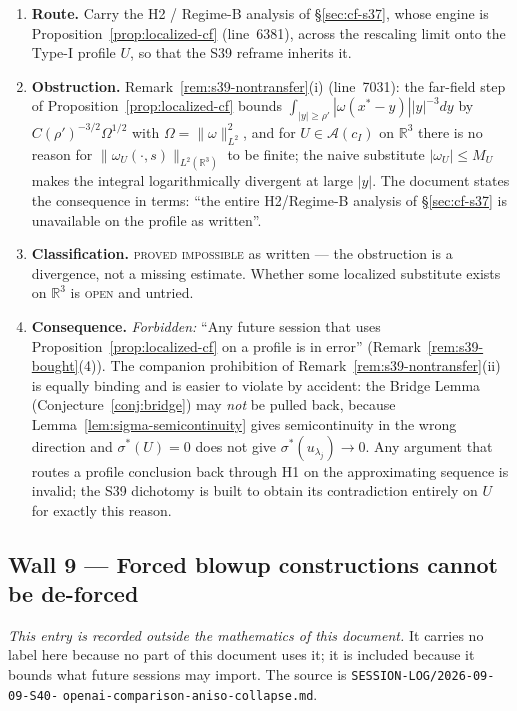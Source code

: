 \documentclass[11pt]{article}
\theoremstyle{definition}
\theoremstyle{remark}
\newcommand{\R}{\mathbb{R}}
\begin{document}
\begin{enumerate}[label=(\alph*),leftmargin=2.2em]
  \item \textbf{Route.} Carry the H2 / Regime-B analysis of
    \S\ref{sec:cf-s37}, whose engine is
    Proposition~\ref{prop:localized-cf} (line~6381), across the rescaling
    limit onto the Type-I profile $U$, so that the S39 reframe inherits it.
  \item \textbf{Obstruction.} Remark~\ref{rem:s39-nontransfer}(i)
    (line~7031): the far-field step of
    Proposition~\ref{prop:localized-cf} bounds
    $\int_{|y|\geq\rho'}|\omega(x^*-y)||y|^{-3}dy$ by
    $C(\rho')^{-3/2}\Omega^{1/2}$ with $\Omega=\|\omega\|_{L^2}^2$, and for
    $U\in\mathcal{A}(c_I)$ on $\R^3$ there is no reason for
    $\|\omega_U(\cdot,s)\|_{L^2(\R^3)}$ to be finite; the naive substitute
    $|\omega_U|\leq M_U$ makes the integral logarithmically divergent at
    large $|y|$. The document states the consequence in terms: ``the entire
    H2/Regime-B analysis of \S\ref{sec:cf-s37} is unavailable on the profile
    as written''.
  \item \textbf{Classification.} \textsc{proved impossible} as written --- the
    obstruction is a divergence, not a missing estimate. Whether some
    localized substitute exists on $\R^3$ is \textsc{open} and untried.
  \item \textbf{Consequence.} \emph{Forbidden:} ``Any future session that uses
    Proposition~\ref{prop:localized-cf} on a profile is in error''
    (Remark~\ref{rem:s39-bought}(4)). The companion prohibition of
    Remark~\ref{rem:s39-nontransfer}(ii) is equally binding and is easier to
    violate by accident: the Bridge Lemma (Conjecture~\ref{conj:bridge}) may
    \emph{not} be pulled back, because
    Lemma~\ref{lem:sigma-semicontinuity} gives semicontinuity in the wrong
    direction and $\sigma^*(U)=0$ does not give
    $\sigma^*(u_{\lambda_j})\to0$. Any argument that routes a profile
    conclusion back through H1 on the approximating sequence is invalid; the
    S39 dichotomy is built to obtain its contradiction entirely on $U$ for
    exactly this reason.
\end{enumerate}

\subsection{Wall 9 --- Forced blowup constructions cannot be de-forced}
\label{subsec:wall9-forcing}

\emph{This entry is recorded outside the mathematics of this document.} It
carries no label here because no part of this document uses it; it is included
because it bounds what future sessions may import. The source is
\texttt{SESSION-LOG/}\allowbreak\texttt{2026-09-09-S40-}\allowbreak
\texttt{openai-comparison-}\allowbreak\texttt{aniso-collapse.md}.
\end{document}
